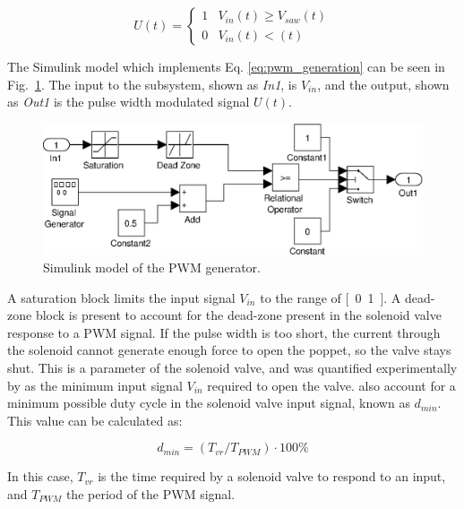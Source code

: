 \begin{equation}
\label{eq:pwm_generation}
U\left(t\right) = 
\begin{cases}
1 & V_{in}\left(t\right) \geq V_{saw}\left(t\right) \\
0 & V_{in}\left(t\right) < \left(t\right)
\end{cases}
\end{equation}

The Simulink model which implements Eq. \ref{eq:pwm_generation} can be seen in Fig.\ \ref{fig:pneumatics_pwm}. The input to the subsystem, shown as \emph{In1}, is $V_{in}$, and the output, shown as \emph{Out1} is the pulse width modulated signal $U(t)$. 

\begin{figure}[H]
\centering
\includegraphics[scale=0.65]{implementation/figures/pneumatic_modelling2.eps}
\caption{Simulink model of the PWM generator.}
\label{fig:pneumatics_pwm}
\end{figure}

A saturation block limits the input signal $V_{in}$ to the range of \unit{[0..1]}{\volt}. A dead-zone block is present to account for the dead-zone present in the solenoid valve response to a PWM signal. If the pulse width is too short, the current through the solenoid cannot generate enough force to open the poppet, so the valve stays shut. This is a parameter of the solenoid valve, and was quantified experimentally by \cite{valve_models} as the minimum input signal $V_{in}$ required to open the valve.  also account for a minimum possible duty cycle in the solenoid valve input signal, known as $d_{min}$. This value can be calculated as:

\begin{equation}
  \label{eq:pwm_duty_min}
  d_{min}=\left(T_{vr}/T_{PWM}\right)\cdot100\%
\end{equation}

In this case, $T_{vr}$ is the time required by a solenoid valve to respond to an input, and $T_{PWM}$ the period of the PWM signal.

